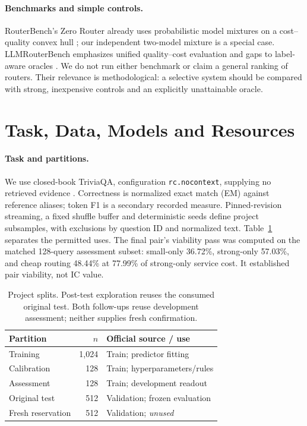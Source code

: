 \documentclass[11pt]{article}
\begin{document}
\paragraph{Benchmarks and simple controls.}
RouterBench's Zero Router already uses probabilistic model mixtures on a cost--quality convex hull \citep{hu2024routerbench}; our independent two-model mixture is a special case. LLMRouterBench emphasizes unified quality--cost evaluation and gaps to label-aware oracles \citep{li2026llmrouterbench}. We do not run either benchmark or claim a general ranking of routers. Their relevance is methodological: a selective system should be compared with strong, inexpensive controls and an explicitly unattainable oracle.

\section{Task, Data, Models and Resources}
\label{sec:resources}
\paragraph{Task and partitions.}
We use closed-book TriviaQA, configuration \texttt{rc.nocontext}, supplying no retrieved evidence \citep{joshi2017triviaqa}. Correctness is normalized exact match (EM) against reference aliases; token F1 is a secondary recorded measure. Pinned-revision streaming, a fixed shuffle buffer and deterministic seeds define project subsamples, with exclusions by question ID and normalized text. Table~\ref{tab:splits} separates the permitted uses. The final pair's viability pass was computed on the matched 128-query assessment subset: small-only 36.72\%, strong-only 57.03\%, and cheap routing 48.44\% at 77.99\% of strong-only service cost. It established pair viability, not IC value.

\begin{table}[t]
\centering\small\setlength{\tabcolsep}{5pt}
\begin{tabular}{lrl}
\toprule
Partition & $n$ & Official source / use \\
\midrule
Training & 1,024 & Train; predictor fitting \\
Calibration & 128 & Train; hyperparameters/rules \\
Assessment & 128 & Train; development readout \\
Original test & 512 & Validation; frozen evaluation \\
Fresh reservation & 512 & Validation; \emph{unused} \\
\bottomrule
\end{tabular}
\caption{Project splits. Post-test exploration reuses the consumed original test. Both follow-ups reuse development assessment; neither supplies fresh confirmation.}
\label{tab:splits}
\end{table}
\end{document}
